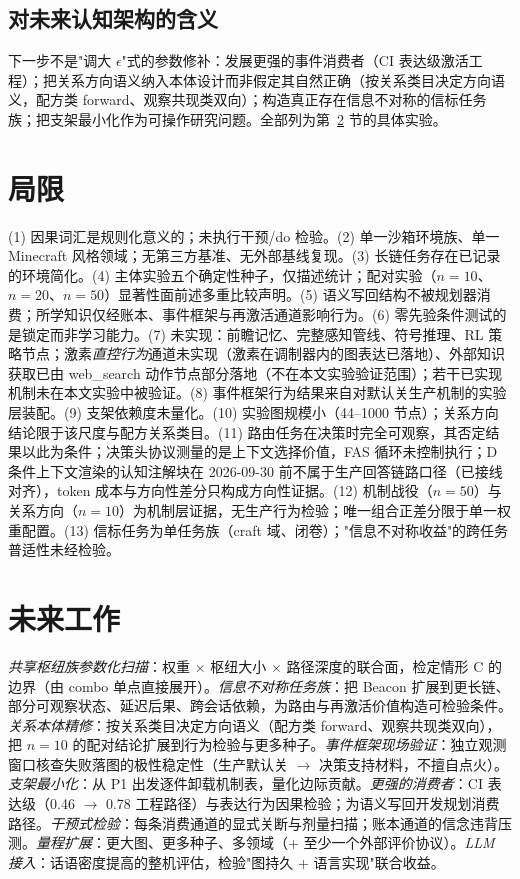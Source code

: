 \documentclass[10pt,a4paper]{ctexart}
\begin{document}
\subsection{对未来认知架构的含义}
下一步不是"调大 $\epsilon$"式的参数修补：发展更强的事件消费者（CI 表达级激活工程）；把关系方向语义纳入本体设计而非假定其自然正确（按关系类目决定方向语义，配方类 forward、观察共现类双向）；构造真正存在信息不对称的信标任务族；把支架最小化作为可操作研究问题。全部列为第~\ref{sec:future} 节的具体实验。

\section{局限}
\label{sec:limits}
(1) 因果词汇是规则化意义的；未执行干预/do 检验。(2) 单一沙箱环境族、单一 Minecraft 风格领域；无第三方基准、无外部基线复现。(3) 长链任务存在已记录的环境简化。(4) 主体实验五个确定性种子，仅描述统计；配对实验（$n{=}10$、$n{=}20$、$n{=}50$）显著性面前述多重比较声明。(5) 语义写回结构不被规划器消费；所学知识仅经账本、事件框架与再激活通道影响行为。(6) 零先验条件测试的是锁定而非学习能力。(7) 未实现：前瞻记忆、完整感知管线、符号推理、RL 策略节点；激素\emph{直控行为}通道未实现（激素在调制器内的图表达已落地）、外部知识获取已由 web\_search 动作节点部分落地（不在本文实验验证范围）；若干已实现机制未在本文实验中被验证。(8) 事件框架行为结果来自对默认关生产机制的实验层装配。(9) 支架依赖度未量化。(10) 实验图规模小（44--1000 节点）；关系方向结论限于该尺度与配方关系类目。(11) 路由任务在决策时完全可观察，其否定结果以此为条件；决策头协议测量的是上下文选择价值，FAS 循环未控制执行；D 条件上下文渲染的认知注解块在 2026-09-30 前不属于生产回答链路口径（已接线对齐），token 成本与方向性差分只构成方向性证据。(12) 机制战役（$n{=}50$）与关系方向（$n{=}10$）为机制层证据，无生产行为检验；唯一组合正差分限于单一权重配置。(13) 信标任务为单任务族（craft 域、闭卷）；"信息不对称收益"的跨任务普适性未经检验。

\section{未来工作}
\label{sec:future}
\emph{共享枢纽族参数化扫描}：权重 $\times$ 枢纽大小 $\times$ 路径深度的联合面，检定情形 C 的边界（由 combo 单点直接展开）。\emph{信息不对称任务族}：把 Beacon 扩展到更长链、部分可观察状态、延迟后果、跨会话依赖，为路由与再激活价值构造可检验条件。\emph{关系本体精修}：按关系类目决定方向语义（配方类 forward、观察共现类双向），把 $n{=}10$ 的配对结论扩展到行为检验与更多种子。\emph{事件框架现场验证}：独立观测窗口核查失败落图的极性稳定性（生产默认关 $\rightarrow$ 决策支持材料，不擅自点火）。\emph{支架最小化}：从 P1 出发逐件卸载机制表，量化边际贡献。\emph{更强的消费者}：CI 表达级（0.46 $\rightarrow$ 0.78 工程路径）与表达行为因果检验；为语义写回开发规划消费路径。\emph{干预式检验}：每条消费通道的显式关断与剂量扫描；账本通道的信念违背压测。\emph{量程扩展}：更大图、更多种子、多领域（+ 至少一个外部评价协议）。\emph{LLM 接入}：话语密度提高的整机评估，检验"图持久 + 语言实现"联合收益。
\end{document}
